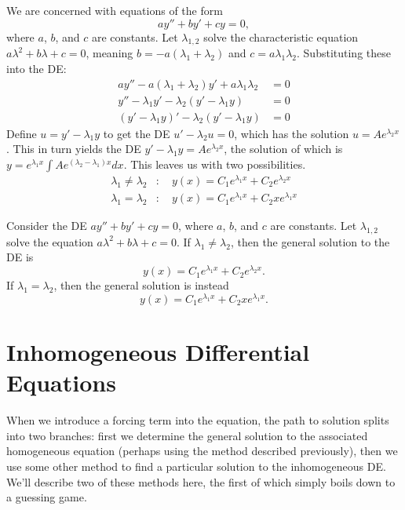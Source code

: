 \documentclass[../m82main.tex]{subfiles}
\begin{document}
\begin{example}
    We are concerned with equations of the form
    \[ ay'' + by' + cy = 0, \]
    where $a$, $b$, and $c$ are constants.
    Let $\lambda_{1,2}$ solve the characteristic equation $a \lambda^2 + b \lambda + c = 0$, meaning $b = -a(\lambda_1 + \lambda_2)$ and $c = a \lambda_1 \lambda_2$.
    Substituting these into the DE:
    \begin{align*}
        ay'' - a(\lambda_1 + \lambda_2)y' + a \lambda_1 \lambda_2 &= 0 \\
        y'' - \lambda_1 y' - \lambda_2 (y' - \lambda_1 y) &= 0 \\
        (y' - \lambda_1 y)' - \lambda_2 (y' - \lambda_1 y) &= 0
    \end{align*}
    Define $u = y' - \lambda_1 y$ to get the DE $u' - \lambda_2 u = 0$, which has the solution $u = Ae^{\lambda_2 x}$.
    This in turn yields the DE $y' - \lambda_1 y = Ae^{\lambda_2 x}$, the solution of which is $\displaystyle y = e^{\lambda_1 x} \int Ae^{(\lambda_2 - \lambda_1)x} dx$.
    This leaves us with two possibilities.
    \begin{align*}
        \lambda_1 \neq \lambda_2&:\quad y(x) = C_1 e^{\lambda_1 x} + C_2 e^{\lambda_2 x} \\
        \lambda_1 = \lambda_2&:\quad y(x) = C_1e^{\lambda_1 x} + C_2 x e^{\lambda_1 x}
    \end{align*}
\end{example}

\begin{theorem}
    Consider the DE $ay'' + by' + cy = 0$, where $a$, $b$, and $c$ are constants.
    Let $\lambda_{1,2}$ solve the equation $a\lambda^2 + b\lambda + c = 0$.
    If $\lambda_1 \neq \lambda_2$, then the general solution to the DE is
    \[ y(x) = C_1 e^{\lambda_1 x} + C_2 e^{\lambda_2 x}. \]
    If $\lambda_1 = \lambda_2$, then the general solution is instead
    \[ y(x) = C_1 e^{\lambda_1 x} + C_2 x e^{\lambda_1 x}. \]
\end{theorem}

\section{Inhomogeneous Differential Equations}
When we introduce a forcing term into the equation, the path to solution splits into two branches: first we determine the general solution to the associated homogeneous equation (perhaps using the method described previously), then we use some other method to find a particular solution to the inhomogeneous DE.
We'll describe two of these methods here, the first of which simply boils down to a guessing game.
\end{document}
